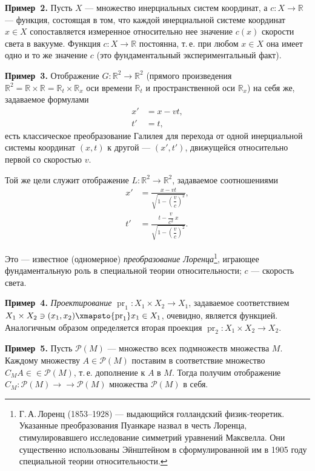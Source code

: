 \textbf{Пример~2.} Пусть $X$ --- множество инерциальных систем координат, а
$c \colon X \to \mathbb{R}$ --- функция, состоящая в том, что каждой инерциальной системе
координат $x \in X$ сопоставляется измеренное относительно нее значение $c(x)$
скорости света в вакууме. Функция $c \colon X \to \mathbb{R}$ постоянна, т.\,е. при любом $x \in X$
она имеет одно и то же значение $c$ (это фундаментальный экспериментальный факт).

\textbf{Пример~3.} Отображение $G \colon \mathbb{R}^2 \to \mathbb{R}^2$ (прямого произведения $\mathbb{R}^2 = \mathbb{R} \times
{} \mathbb{R} = \mathbb{R}_t \times \mathbb{R}_x$ оси времени $\mathbb{R}_t$ и пространственной оси $\mathbb{R}_x$) на себя же, задаваемое формулами
\begin{align*}
  x' &= x - vt, \\
  t' &= t,
\end{align*}
есть классическое преобразование Галилея для перехода от одной инерциальной системы координат $(x, t)$ к другой --- $(x', t')$, движущейся относительно первой со скоростью $v$.

Той же цели служит отображение $L \colon \mathbb{R}^2 \to \mathbb{R}^2$, задаваемое соотношениями
\begin{align*}
  x' &= \frac{x - vt}{\sqrt{1 - \left(\dfrac{v}{c}\right)^2}}, \\[6pt]
  t' &= \frac{t - \dfrac{v}{c^2}\,x}{\sqrt{1 - \left(\dfrac{v}{c}\right)^2}}.
\end{align*}

Это --- известное (одномерное) \textit{преобразование Лоренца}\footnote{Г.\,А.\,Лоренц (1853--1928) --- выдающийся голландский физик-теоретик. Указанные
преобразования Пуанкаре назвал в честь Лоренца, стимулировавшего исследование симметрий уравнений Максвелла. Они существенно использованы Эйнштейном в сформулированной им в 1905 году специальной теории относительности.}, играющее фундаментальную роль в специальной теории относительности; $c$ --- скорость
света.

\textbf{Пример~4.} \textit{Проектирование} $\operatorname{pr}_1 \colon X_1 \times X_2 \to X_1$, задаваемое соответствием $X_1 \times X_2 \ni (x_1, x_2) \xmapsto{\operatorname{pr}_1} x_1 \in X_1$, очевидно, является функцией. Аналогичным
образом определяется вторая проекция $\operatorname{pr}_2 \colon X_1 \times X_2 \to X_2$.

\textbf{Пример~5.} Пусть $\mathscr{P}(M)$ --- множество всех подмножеств множества $M$.
Каждому множеству $A \in \mathscr{P}(M)$ поставим в соответствие множество $C_M A \in
{} \in \mathscr{P}(M)$, т.\,е. дополнение к $A$ в $M$. Тогда получим отображение $C_M \colon \mathscr{P}(M) \to
{} \to \mathscr{P}(M)$ множества $\mathscr{P}(M)$ в себя.

